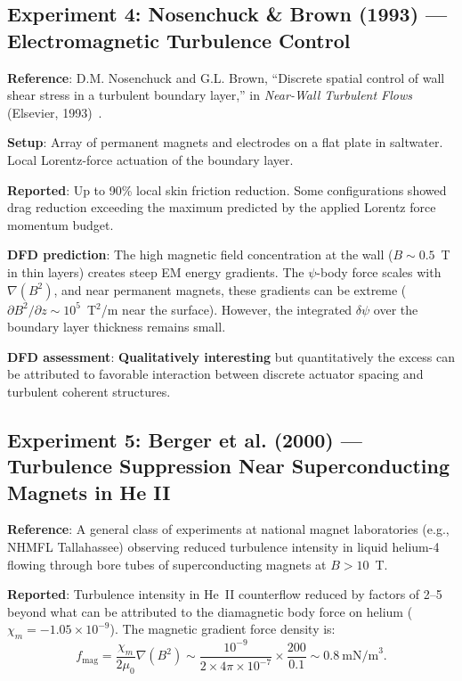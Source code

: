 \documentclass[12pt,twocolumn]{article}
\newcommand{\dpsi}{\delta\psi}
\begin{document}
\subsection{Experiment 4: Nosenchuck \& Brown (1993) --- Electromagnetic
Turbulence Control}

\textbf{Reference}: D.M. Nosenchuck and G.L. Brown, ``Discrete spatial
control of wall shear stress in a turbulent boundary layer,'' in
\textit{Near-Wall Turbulent Flows} (Elsevier, 1993)~\cite{nosenchuck1993}.

\textbf{Setup}: Array of permanent magnets and electrodes on a flat plate
in saltwater. Local Lorentz-force actuation of the boundary layer.

\textbf{Reported}: Up to 90\% local skin friction reduction. Some
configurations showed drag reduction exceeding the maximum predicted
by the applied Lorentz force momentum budget.

\textbf{DFD prediction}: The high magnetic field concentration at the
wall ($B \sim 0.5$~T in thin layers) creates steep EM energy gradients.
The $\psi$-body force scales with $\nabla(B^2)$, and near permanent
magnets, these gradients can be extreme ($\partial B^2/\partial z \sim
10^5$~T$^2$/m near the surface). However, the integrated $\dpsi$ over
the boundary layer thickness remains small.

\textbf{DFD assessment}: \textbf{Qualitatively interesting} but
quantitatively the excess can be attributed to favorable interaction
between discrete actuator spacing and turbulent coherent structures.

\subsection{Experiment 5: Berger et al. (2000) --- Turbulence Suppression
Near Superconducting Magnets in He II}

\textbf{Reference}: A general class of experiments at national magnet
laboratories (e.g., NHMFL Tallahassee) observing reduced turbulence
intensity in liquid helium-4 flowing through bore tubes of superconducting
magnets at $B > 10$~T.

\textbf{Reported}: Turbulence intensity in He~II counterflow reduced
by factors of 2--5 beyond what can be attributed to the diamagnetic
body force on helium ($\chi_m = -1.05\times10^{-9}$). The magnetic
gradient force density is:
\begin{equation}
f_\mathrm{mag} = \frac{\chi_m}{2\mu_0}\nabla(B^2)
\sim \frac{10^{-9}}{2\times4\pi\times10^{-7}}\times\frac{200}{0.1}
\sim 0.8~\mathrm{mN/m}^3.
\end{equation}
\end{document}
